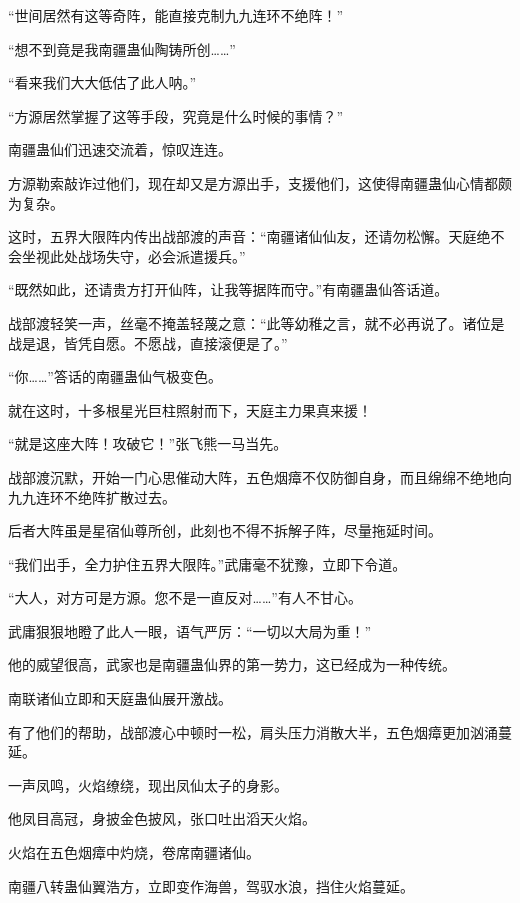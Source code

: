 
\begin{this_body}

“世间居然有这等奇阵，能直接克制九九连环不绝阵！”

“想不到竟是我南疆蛊仙陶铸所创……”

“看来我们大大低估了此人呐。”

“方源居然掌握了这等手段，究竟是什么时候的事情？”

南疆蛊仙们迅速交流着，惊叹连连。

方源勒索敲诈过他们，现在却又是方源出手，支援他们，这使得南疆蛊仙心情都颇为复杂。

这时，五界大限阵内传出战部渡的声音：“南疆诸仙仙友，还请勿松懈。天庭绝不会坐视此处战场失守，必会派遣援兵。”

“既然如此，还请贵方打开仙阵，让我等据阵而守。”有南疆蛊仙答话道。

战部渡轻笑一声，丝毫不掩盖轻蔑之意：“此等幼稚之言，就不必再说了。诸位是战是退，皆凭自愿。不愿战，直接滚便是了。”

“你……”答话的南疆蛊仙气极变色。

就在这时，十多根星光巨柱照射而下，天庭主力果真来援！

“就是这座大阵！攻破它！”张飞熊一马当先。

战部渡沉默，开始一门心思催动大阵，五色烟瘴不仅防御自身，而且绵绵不绝地向九九连环不绝阵扩散过去。

后者大阵虽是星宿仙尊所创，此刻也不得不拆解子阵，尽量拖延时间。

“我们出手，全力护住五界大限阵。”武庸毫不犹豫，立即下令道。

“大人，对方可是方源。您不是一直反对……”有人不甘心。

武庸狠狠地瞪了此人一眼，语气严厉：“一切以大局为重！”

他的威望很高，武家也是南疆蛊仙界的第一势力，这已经成为一种传统。

南联诸仙立即和天庭蛊仙展开激战。

有了他们的帮助，战部渡心中顿时一松，肩头压力消散大半，五色烟瘴更加汹涌蔓延。

一声凤鸣，火焰缭绕，现出凤仙太子的身影。

他凤目高冠，身披金色披风，张口吐出滔天火焰。

火焰在五色烟瘴中灼烧，卷席南疆诸仙。

南疆八转蛊仙翼浩方，立即变作海兽，驾驭水浪，挡住火焰蔓延。


\end{this_body}
